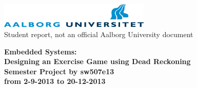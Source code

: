 \thispagestyle{empty} %
\begin{center}
	\includegraphics[height=1.2cm]{media/aau-logo}\\
	\vspace{0.25cm}
	Student report, not an official Aalborg University document
\end{center} 

\vspace{1cm}
\begin{center}
\textbf{\Huge {Embedded Systems:}} \\ \vspace{0.5cm}
\textbf{\huge {Designing an Exercise Game using Dead Reckoning}} \\ \vspace{1cm}
\textbf{\Large Semester Project by sw507e13}\\ \vspace{0.5cm}
\textbf{\large from 2-9-2013 to 20-12-2013}\\
\end{center}

\vspace{0.25cm}


\thispagestyle{empty}

\newpage
\thispagestyle{empty}
\mbox{}


